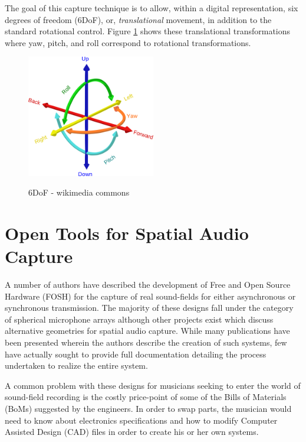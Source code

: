 The goal of this capture technique is to allow, within a digital representation, six degrees of freedom (6DoF), or, \textit{translational} movement, in addition to the standard rotational control. Figure \ref{fig:6DoF} shows these translational transformations where yaw, pitch, and roll correspond to rotational transformations. 

\begin{figure}[h!]%
\centering
\includegraphics[width=0.5\textwidth]{img/6DOF.svg.png} 
\label{fig:6DoF}
\caption{6DoF - wikimedia commons}
\end{figure}

\section{Open Tools for Spatial Audio Capture}


A number of authors have described the development of Free and Open Source Hardware (FOSH) for the capture of real sound-fields for either asynchronous or synchronous transmission. The majority of these designs fall under the category of spherical microphone arrays although other projects exist which discuss alternative geometries for spatial audio capture. While many publications have been presented wherein the authors describe the creation of such systems, few have actually sought to provide full documentation detailing the process undertaken to realize the entire system. 

A common problem with these designs for musicians seeking to enter the world of sound-field recording is the costly price-point of some of the Bills of Materials (BoMs) suggested by the engineers. In order to swap parts, the musician would need to know about electronics specifications and how to modify Computer Assisted Design (CAD) files in order to create his or her own systems.

